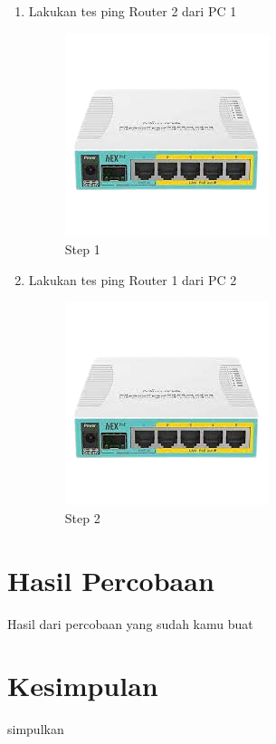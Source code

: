 \begin{enumerate}
	\item Lakukan tes ping Router 2 dari PC 1
	\begin{figure}[H]
		\centering
		\includegraphics[width=0.5\linewidth]{P1/img/contoh.png}
		\caption{Step 1}
		\label{fig:gambar14}
	\end{figure}

	\item Lakukan tes ping Router 1 dari PC 2
	\begin{figure}[H]
		\centering
		\includegraphics[width=0.5\linewidth]{P1/img/contoh.png}
		\caption{Step 2}
		\label{fig:gambar15}
	\end{figure}

\end{enumerate}

\section{Hasil Percobaan}
Hasil dari percobaan yang sudah kamu buat

\section{Kesimpulan}
simpulkan

